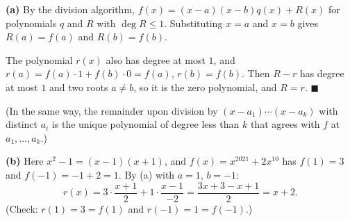 \textbf{(a)} By the division algorithm, $f(x)=(x-a)(x-b)q(x)+R(x)$ for polynomials $q$ and $R$ with $\deg R\le1$. Substituting $x=a$ and $x=b$ gives $R(a)=f(a)$ and $R(b)=f(b)$.

The polynomial $r(x)$ also has degree at most $1$, and $r(a)=f(a)\cdot1+f(b)\cdot0=f(a)$, $r(b)=f(b)$. Then $R-r$ has degree at most $1$ and two roots $a\ne b$, so it is the zero polynomial, and $R=r$. $\blacksquare$

(In the same way, the remainder upon division by $(x-a_1)\cdots(x-a_k)$ with distinct $a_i$ is the unique polynomial of degree less than $k$ that agrees with $f$ at $a_1,\dots,a_k$.)

\textbf{(b)} Here $x^2-1=(x-1)(x+1)$, and $f(x)=x^{2021}+2x^{10}$ has $f(1)=3$ and $f(-1)=-1+2=1$. By (a) with $a=1$, $b=-1$:
\[r(x)=3\cdot\dfrac{x+1}{2}+1\cdot\dfrac{x-1}{-2}=\dfrac{3x+3-x+1}{2}=\boxed{x+2}.\]
(Check: $r(1)=3=f(1)$ and $r(-1)=1=f(-1)$.)
